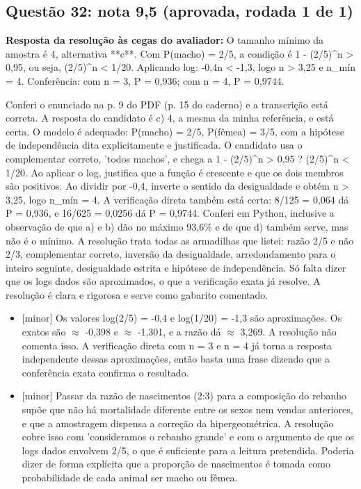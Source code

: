 \documentclass{article}%
\begin{document}
\subsection*{Questão 32: nota 9,5 (aprovada, rodada 1 de 1)}%
\textbf{Resposta da resolução às cegas do avaliador:} O tamanho mínimo da amostra é 4, alternativa **c**. Com P(macho) = 2/5, a condição é 1 - (2/5)\^{}n > 0,95, ou seja, (2/5)\^{}n < 1/20. Aplicando log: -0,4n < -1,3, logo n > 3,25 e n\_mín = 4. Conferência: com n = 3, P = 0,936; com n = 4, P = 0,9744.\par %
Conferi o enunciado na p. 9 do PDF (p. 15 do caderno) e a transcrição está correta. A resposta do candidato é c) 4, a mesma da minha referência, e está certa. O modelo é adequado: P(macho) = 2/5, P(fêmea) = 3/5, com a hipótese de independência dita explicitamente e justificada. O candidato usa o complementar correto, 'todos machos', e chega a 1 - (2/5)\^{}n > 0,95 ? (2/5)\^{}n < 1/20. Ao aplicar o log, justifica que a função é crescente e que os dois membros são positivos. Ao dividir por -0,4, inverte o sentido da desigualdade e obtém n > 3,25, logo n\_mín = 4. A verificação direta também está certa: 8/125 = 0,064 dá P = 0,936, e 16/625 = 0,0256 dá P = 0,9744. Conferi em Python, inclusive a observação de que a) e b) dão no máximo 93,6\% e de que d) também serve, mas não é o mínimo. A resolução trata todas as armadilhas que listei: razão 2/5 e não 2/3, complementar correto, inversão da desigualdade, arredondamento para o inteiro seguinte, desigualdade estrita e hipótese de independência. Só falta dizer que os logs dados são aproximados, o que a verificação exata já resolve. A resolução é clara e rigorosa e serve como gabarito comentado.%
\begin{itemize}%
\item%
{[}minor{]} Os valores log(2/5) = -0,4 e log(1/20) = -1,3 são aproximações. Os exatos são $\approx$ -0,398 e $\approx$ -1,301, e a razão dá $\approx$ 3,269. A resolução não comenta isso. A verificação direta com n = 3 e n = 4 já torna a resposta independente dessas aproximações, então basta uma frase dizendo que a conferência exata confirma o resultado.%
\item%
{[}minor{]} Passar da razão de nascimentos (2:3) para a composição do rebanho supõe que não há mortalidade diferente entre os sexos nem vendas anteriores, e que a amostragem dispensa a correção da hipergeométrica. A resolução cobre isso com 'consideramos o rebanho grande' e com o argumento de que os logs dados envolvem 2/5, o que é suficiente para a leitura pretendida. Poderia dizer de forma explícita que a proporção de nascimentos é tomada como probabilidade de cada animal ser macho ou fêmea.%
\end{itemize}%
\end{document}
